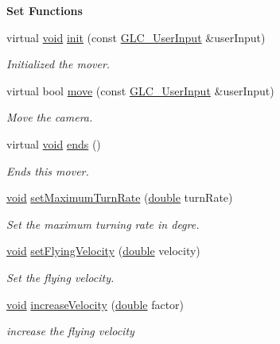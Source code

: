 \begin{Indent}{\bf Set Functions}\par
\begin{DoxyCompactItemize}
\item 
virtual \hyperlink{group___u_a_v_objects_plugin_ga444cf2ff3f0ecbe028adce838d373f5c}{void} \hyperlink{class_g_l_c___fly_mover_a9bd77b3a82302d074a53f7e95916f657}{init} (const \hyperlink{class_g_l_c___user_input}{G\-L\-C\-\_\-\-User\-Input} \&user\-Input)
\begin{DoxyCompactList}\small\item\em Initialized the mover. \end{DoxyCompactList}\item 
virtual bool \hyperlink{class_g_l_c___fly_mover_af667d8526c4ef6522e50c028d69e43c7}{move} (const \hyperlink{class_g_l_c___user_input}{G\-L\-C\-\_\-\-User\-Input} \&user\-Input)
\begin{DoxyCompactList}\small\item\em Move the camera. \end{DoxyCompactList}\item 
virtual \hyperlink{group___u_a_v_objects_plugin_ga444cf2ff3f0ecbe028adce838d373f5c}{void} \hyperlink{class_g_l_c___fly_mover_aa614f2be5e7f5781fadd669947f4b64e}{ends} ()
\begin{DoxyCompactList}\small\item\em Ends this mover. \end{DoxyCompactList}\item 
\hyperlink{group___u_a_v_objects_plugin_ga444cf2ff3f0ecbe028adce838d373f5c}{void} \hyperlink{class_g_l_c___fly_mover_a411b4c6bae54b13f2c173bb14bab47d8}{set\-Maximum\-Turn\-Rate} (\hyperlink{_super_l_u_support_8h_a8956b2b9f49bf918deed98379d159ca7}{double} turn\-Rate)
\begin{DoxyCompactList}\small\item\em Set the maximum turning rate in degre. \end{DoxyCompactList}\item 
\hyperlink{group___u_a_v_objects_plugin_ga444cf2ff3f0ecbe028adce838d373f5c}{void} \hyperlink{class_g_l_c___fly_mover_a8763877a087b70aff3e241c03ce64b08}{set\-Flying\-Velocity} (\hyperlink{_super_l_u_support_8h_a8956b2b9f49bf918deed98379d159ca7}{double} velocity)
\begin{DoxyCompactList}\small\item\em Set the flying velocity. \end{DoxyCompactList}\item 
\hyperlink{group___u_a_v_objects_plugin_ga444cf2ff3f0ecbe028adce838d373f5c}{void} \hyperlink{class_g_l_c___fly_mover_ace8dae8c0f58477eaf198c550a573c02}{increase\-Velocity} (\hyperlink{_super_l_u_support_8h_a8956b2b9f49bf918deed98379d159ca7}{double} factor)
\begin{DoxyCompactList}\small\item\em increase the flying velocity \end{DoxyCompactList}\end{DoxyCompactItemize}
\end{Indent}
